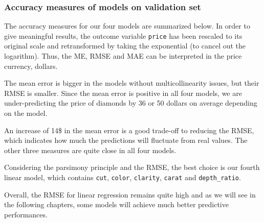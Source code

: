 \documentclass[
  paper=a4,
  ,captions=tableheading
]{scrartcl}
\begin{document}
\hypertarget{accuracy-measures-of-models-on-validation-set}{%
\subsubsection{Accuracy measures of models on validation
set}\label{accuracy-measures-of-models-on-validation-set}}

The accuracy measures for our four models are summarized below. In order
to give meaningful results, the outcome variable \texttt{price} has been
rescaled to its original scale and retransformed by taking the
exponential (to cancel out the logarithm). Thus, the ME, RMSE and MAE
can be interpreted in the price currency, dollars.

\begin{table}[!h]

\caption{\label{tab:models-accuracy-table}Accuracy measures of linear models}
\centering
{}
\end{table}

The mean error is bigger in the models without multicollinearity issues,
but their RMSE is smaller. Since the mean error is positive in all four
models, we are under-predicting the price of diamonds by 36 or 50
dollars on average depending on the model.

An increase of 14\$ in the mean error is a good trade-off to reducing
the RMSE, which indicates how much the predictions will fluctuate from
real values. The other three measures are quite close in all four
models.

Considering the parsimony principle and the RMSE, the best choice is our
fourth linear model, which contains \texttt{cut}, \texttt{color},
\texttt{clarity}, \texttt{carat} and \texttt{depth\_ratio}.

Overall, the RMSE for linear regression remains quite high and as we
will see in the following chapters, some models will achieve much better
predictive performances.
\end{document}
